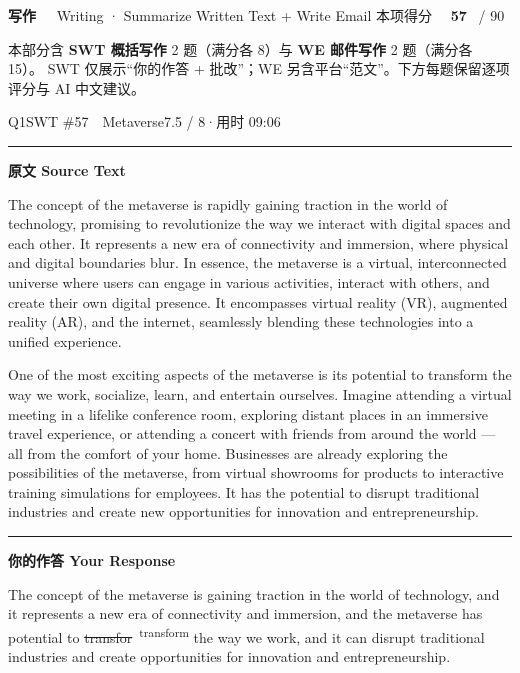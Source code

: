 \documentclass[11pt]{article}
\newcommand{\fix}[2]{%
  \colorbox{cWrongBg}{\textcolor{cWrong}{\sout{#1}}}%
  \,\textsuperscript{\textcolor{cFix}{\footnotesize #2}}}
\newcommand{\ptesub}[1]{%
  \par\needspace{2\baselineskip}\smallskip
  {\color{cAccent}\rule[-0.2ex]{3pt}{1.05em}}\hspace{6pt}%
  {\bfseries\color{cHead}#1}\par\nopagebreak\smallskip}
\newcommand{\ptesection}[3]{%
  \needspace{6\baselineskip}
  \begin{tcolorbox}[enhanced, colback=cAccent, colframe=cAccent, sharp corners,
     left=14pt, right=14pt, top=10pt, bottom=10pt, boxrule=0pt]
    {\fontsize{20}{24}\selectfont\bfseries\color{white} #1\ \ }%
    {\large\color{white!85} #2}\hfill
    {\large\color{white}本项得分\ \ }{\fontsize{22}{24}\selectfont\bfseries\color{white} #3}%
    \ {\color{white!85}/ 90}
  \end{tcolorbox}}
\begin{document}
\ptesection{写作}{Writing · Summarize Written Text + Write Email}{57}

\vspace{1mm}
{\small\color{gray} 本部分含 \textbf{SWT 概括写作} 2 题（满分各 8）与 \textbf{WE 邮件写作} 2 题（满分各 15）。
SWT 仅展示“你的作答 + 批改”；WE 另含平台“范文”。下方每题保留逐项评分与 AI 中文建议。}
\vspace{2mm}


\begin{qblock}{Q1\quad SWT \#57\ \ Metaverse}{7.5 / 8\quad·\quad 用时 09:06}

\ptesub{原文 Source Text}
\begin{promptbox}
The concept of the metaverse is rapidly gaining traction in the world of technology, promising to revolutionize the way we interact with digital spaces and each other. It represents a new era of connectivity and immersion, where physical and digital boundaries blur. In essence, the metaverse is a virtual, interconnected universe where users can engage in various activities, interact with others, and create their own digital presence. It encompasses virtual reality (VR), augmented reality (AR), and the internet, seamlessly blending these technologies into a unified experience.

One of the most exciting aspects of the metaverse is its potential to transform the way we work, socialize, learn, and entertain ourselves. Imagine attending a virtual meeting in a lifelike conference room, exploring distant places in an immersive travel experience, or attending a concert with friends from around the world --- all from the comfort of your home. Businesses are already exploring the possibilities of the metaverse, from virtual showrooms for products to interactive training simulations for employees. It has the potential to disrupt traditional industries and create new opportunities for innovation and entrepreneurship.
\end{promptbox}

\ptesub{你的作答 Your Response}
\begin{youbox}
The concept of the metaverse is gaining traction in the world of technology, and it represents a new era of connectivity and immersion, and the metaverse has potential to \fix{transfor}{transform} the way we work, and it can disrupt traditional industries and create opportunities for innovation and entrepreneurship.
\end{youbox}


\end{qblock}
\end{document}
